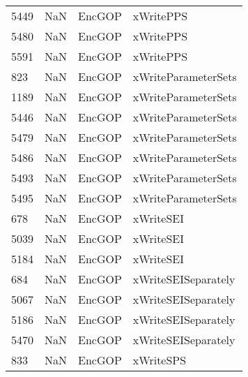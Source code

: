 \begin{tabular}{llll}
5449 &                   NaN &                     EncGOP &                                 xWritePPS \\
5480 &                   NaN &                     EncGOP &                                 xWritePPS \\
5591 &                   NaN &                     EncGOP &                                 xWritePPS \\
823  &                   NaN &                     EncGOP &                       xWriteParameterSets \\
1189 &                   NaN &                     EncGOP &                       xWriteParameterSets \\
5446 &                   NaN &                     EncGOP &                       xWriteParameterSets \\
5479 &                   NaN &                     EncGOP &                       xWriteParameterSets \\
5486 &                   NaN &                     EncGOP &                       xWriteParameterSets \\
5493 &                   NaN &                     EncGOP &                       xWriteParameterSets \\
5495 &                   NaN &                     EncGOP &                       xWriteParameterSets \\
678  &                   NaN &                     EncGOP &                                 xWriteSEI \\
5039 &                   NaN &                     EncGOP &                                 xWriteSEI \\
5184 &                   NaN &                     EncGOP &                                 xWriteSEI \\
684  &                   NaN &                     EncGOP &                       xWriteSEISeparately \\
5067 &                   NaN &                     EncGOP &                       xWriteSEISeparately \\
5186 &                   NaN &                     EncGOP &                       xWriteSEISeparately \\
5470 &                   NaN &                     EncGOP &                       xWriteSEISeparately \\
833  &                   NaN &                     EncGOP &                                 xWriteSPS \\

\end{tabular}
